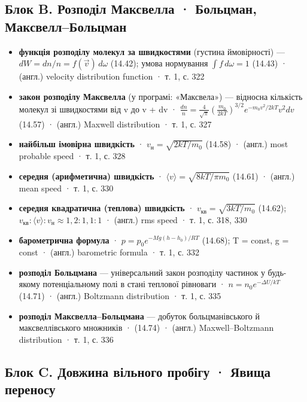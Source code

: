 \documentclass[11pt,a4paper,oneside]{book}
\newcommand{\book}{}
\begin{document}
\subsection*{Блок B. Розподіл Максвелла · Больцман, Максвелл–Больцман}

\begin{itemize}
\item \textbf{функція розподілу молекул за швидкостями} (густина ймовірності) — $dW = dn/n = f(\vec v)\,d\omega$ (14.42); умова нормування $\int f\,d\omega = 1$ (14.43) · (англ.) velocity distribution function · \book{} т. 1, с. 322
\item \textbf{закон розподілу Максвелла} (у програмі: «Максвела») — відносна кількість молекул зі швидкостями від v до v + dv · $\frac{dn}{n} = \frac4{\sqrt\pi}\left(\frac{m_0}{2kT}\right)^{3/2}e^{-m_0v^2/2kT}v^2dv$ (14.57) · (англ.) Maxwell distribution · \book{} т. 1, с. 327
\item \textbf{найбільш імовірна швидкість} · $v_\text{н} = \sqrt{2kT/m_0}$ (14.58) · (англ.) most probable speed · \book{} т. 1, с. 328
\item \textbf{середня (арифметична) швидкість} · $\langle v\rangle = \sqrt{8kT/\pi m_0}$ (14.61) · (англ.) mean speed · \book{} т. 1, с. 330
\item \textbf{середня квадратична (теплова) швидкість} · $v_{\text{кв}} = \sqrt{3kT/m_0}$ (14.62); $v_{\text{кв}} : \langle v\rangle : v_\text{н} \approx 1{,}2 : 1{,}1 : 1$ · (англ.) rms speed · \book{} т. 1, с. 318, 330
\item \textbf{барометрична формула} · $p = p_0e^{-Mg(h-h_0)/RT}$ (14.68); T = const, g = const · (англ.) barometric formula · \book{} т. 1, с. 332
\item \textbf{розподіл Больцмана} — універсальний закон розподілу частинок у будь-якому потенціальному полі в стані теплової рівноваги · $n = n_0e^{-\Delta U/kT}$ (14.71) · (англ.) Boltzmann distribution · \book{} т. 1, с. 335
\item \textbf{розподіл Максвелла–Больцмана} — добуток больцманівського й максвеллівського множників · (14.74) · (англ.) Maxwell–Boltzmann distribution · \book{} т. 1, с. 336
\end{itemize}

\subsection*{Блок C. Довжина вільного пробігу · Явища переносу}
\end{document}
